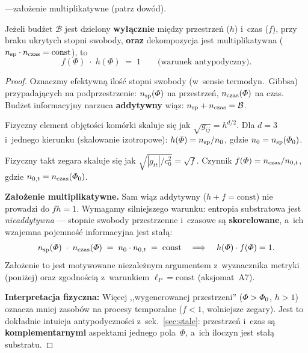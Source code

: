\begin{proposition}%
\label{prop:antipodal-from-budget}
\;---\;za\l{}o\.zenie multiplikatywne
(patrz dow\'od).

\noindent
Je\.zeli bud\.zet $\mathcal{B}$ jest dzielony \textbf{wy\l{}\k{a}cznie}
mi\k{e}dzy przestrze\'n ($h$) i~czas ($f$), przy braku ukrytych
stopni swobody, \textbf{oraz} dekompozycja jest multiplikatywna
($n_{\rm sp}\cdot n_{\rm czas} = \text{const}$), to
\begin{equation}\label{eq:f-h-1}
  \boxed{f(\Phi)\;\cdot\;h(\Phi) \;=\; 1}
  \qquad \text{(warunek antypodyczny)}.
\end{equation}
\end{proposition}

\begin{proof}
Oznaczmy efektywn\k{a} ilo\'s\'c stopni swobody
(w~sensie termodyn.\ Gibbsa) przypadaj\k{a}cych na podprzestrzenie:
$n_{\rm sp}(\Phi)$ na przestrze\'n, $n_{\rm czas}(\Phi)$ na czas.
Bud\.zet informacyjny narzuca \textbf{addytywny} wi\k{a}z:
$n_{\rm sp} + n_{\rm czas} = \mathcal{B}$.

Fizyczny element obj\k{e}to\'sci kom\'orki skaluje si\k{e} jak
$\sqrt{g_{ij}} = h^{d/2}$. Dla $d = 3$ i~jednego kierunku
(skalowanie izotropowe): $h(\Phi) = n_{\rm sp}/n_0$,
gdzie $n_0 = n_{\rm sp}(\PhiZero)$.

Fizyczny takt zegara skaluje si\k{e} jak $\sqrt{|g_{tt}|/c_0^2} = \sqrt{f}$.
Czynnik $f(\Phi) = n_{\rm czas}/n_{0,t}$, gdzie $n_{0,t} = n_{\rm czas}(\PhiZero)$.

\smallskip\noindent
\textbf{Za\l{}o\.zenie multiplikatywne.}
Sam wi\k{a}z addytywny ($h + f = \text{const}$) nie prowadzi
do $fh = 1$. Wymagamy silniejszego warunku: entropia
substratowa jest \emph{nieaddytywna} --- stopnie swobody
przestrzenne i~czasowe s\k{a} \textbf{skorelowane},
a~ich wzajemna pojemno\'s\'c informacyjna jest sta\l{}\k{a}:
\begin{equation}
  n_{\rm sp}(\Phi)\;\cdot\; n_{\rm czas}(\Phi)
  \;=\; n_0 \cdot n_{0,t}
  \;=\; \text{const}
  \quad\Longrightarrow\quad
  h(\Phi)\cdot f(\Phi) = 1.
\end{equation}
Za\l{}o\.zenie to jest motywowane niezale\.znym argumentem
z~wyznacznika metryki (poni\.zej) oraz zgodno\'sci\k{a}
z~warunkiem $\ell_P = \text{const}$ (aksjomat~A7).

\smallskip\noindent
\textbf{Interpretacja fizyczna:}
Wi\k{e}cej ,,wygenerowanej przestrzeni'' ($\Phi > \PhiZero$, $h > 1$)
oznacza mniej zasob\'ow na procesy temporalne ($f < 1$,
wolniejsze zegary). Jest to dok\l{}adnie intuicja
antypodyczno\'sci z~sek.~\ref{sec:stale}: przestrze\'n
i~czas s\k{a} \textbf{komplementarnymi} aspektami
jednego pola~$\Phi$, a~ich iloczyn jest sta\l{}\k{a} substratu.


\end{proof}
